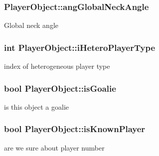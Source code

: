 \subsubsection[{\texorpdfstring{ang\+Global\+Neck\+Angle}{angGlobalNeckAngle}}]{ Player\+Object\+::ang\+Global\+Neck\+Angle\hspace{0.3cm}{\ttfamily [protected]}}\hypertarget{classPlayerObject_a98882a1394f93e2e72e3aeeb353129ab}{}\label{classPlayerObject_a98882a1394f93e2e72e3aeeb353129ab}
Global neck angle 
\subsubsection[{\texorpdfstring{i\+Hetero\+Player\+Type}{iHeteroPlayerType}}]{\setlength{\rightskip}{0pt plus 5cm}int Player\+Object\+::i\+Hetero\+Player\+Type\hspace{0.3cm}{\ttfamily [protected]}}\hypertarget{classPlayerObject_a0a5a1732ec44a123c083ee7f71959354}{}\label{classPlayerObject_a0a5a1732ec44a123c083ee7f71959354}
index of heterogeneous player type 
\subsubsection[{\texorpdfstring{is\+Goalie}{isGoalie}}]{\setlength{\rightskip}{0pt plus 5cm}bool Player\+Object\+::is\+Goalie\hspace{0.3cm}{\ttfamily [protected]}}\hypertarget{classPlayerObject_a1e486f02cc1cd54d0c4dbf34b0146b06}{}\label{classPlayerObject_a1e486f02cc1cd54d0c4dbf34b0146b06}
is this object a goalie 
\subsubsection[{\texorpdfstring{is\+Known\+Player}{isKnownPlayer}}]{\setlength{\rightskip}{0pt plus 5cm}bool Player\+Object\+::is\+Known\+Player\hspace{0.3cm}{\ttfamily [protected]}}\hypertarget{classPlayerObject_a699d8554acd0197ba5393040bec150c4}{}\label{classPlayerObject_a699d8554acd0197ba5393040bec150c4}
are we sure about player number 
